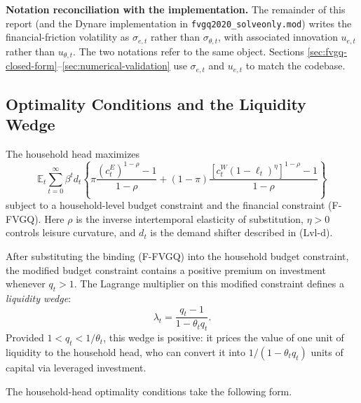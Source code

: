 \documentclass[11pt]{article}
\newcommand{\E}{\mathbb{E}}
\newcommand{\sige}{\sigma_{e,t}}
\newcommand{\cE}{c^E_t}
\newcommand{\cW}{c^W_t}
\theoremstyle{plain}
\theoremstyle{definition}
\begin{document}
\medskip

\noindent\textbf{Notation reconciliation with the implementation.}
The remainder of this report (and the Dynare implementation in
\texttt{fvgq2020\_solveonly.mod}) writes the financial-friction
volatility as $\sige$ rather than $\sigma_{\theta,t}$, with associated
innovation $u_{e,t}$ rather than $u_{\theta,t}$. The two notations refer to
the same object. Sections \ref{sec:fvgq-closed-form}--\ref{sec:numerical-validation}
use $\sige$ and $u_{e,t}$ to match the codebase.

\subsection{Optimality Conditions and the Liquidity Wedge}

The household head maximizes
\begin{equation}
\E_t \sum_{t=0}^\infty \beta^t d_t
\left\{
\pi \frac{(\cE)^{1-\rho}-1}{1-\rho}
+ (1-\pi) \frac{[\cW (1-\ell_t)^\eta]^{1-\rho}-1}{1-\rho}
\right\}
\tag{U-FVGQ}
\end{equation}
subject to a household-level budget constraint and the financial constraint
(F-FVGQ). Here $\rho$ is the inverse intertemporal elasticity of substitution,
$\eta>0$ controls leisure curvature, and $d_t$ is the demand shifter described
in (Lvl-d).

After substituting the binding (F-FVGQ) into the household budget constraint,
the modified budget constraint contains a positive premium on investment
whenever $q_t>1$. The Lagrange multiplier on this modified constraint defines
a \emph{liquidity wedge}:
\begin{equation}
\lambda_t = \frac{q_t - 1}{1 - \theta_t q_t}.
\tag{Liq-FVGQ}
\end{equation}
Provided $1 < q_t < 1/\theta_t$, this wedge is positive: it prices the value
of one unit of liquidity to the household head, who can convert it into
$1/(1-\theta_t q_t)$ units of capital via leveraged investment.

The household-head optimality conditions take the following form.
\end{document}
